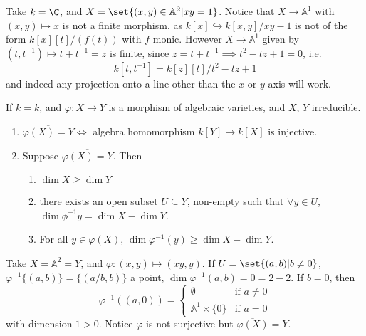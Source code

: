 \documentclass{article}
\newcommand{\A}{\mathbb{A}}
\begin{document}
\begin{eg}
    Take $k = \C$, and $X = \set{(x, y) \in \A^2 | x y = 1}$. Notice that $X \to \A^1$ with $(x, y) \mapsto x$ is not a finite morphism, as $k[x] \hookrightarrow k[x, y] /xy-1$ is not of the form $k[x][t]/(f(t))$ with $f$ monic.
    However $X \to \A^1$ given by $(t, t^{-1}) \mapsto t + t^{-1} = z$ is finite, since $z = t+t^{-1} \implies t^2 - tz + 1 = 0$, i.e.\
    \begin{equation}
        k[t, t^{-1}] = k[z][t]/t^2-tz+1
    \end{equation}
    and indeed any projection onto a line other than the $x$ or $y$ axis will work.
\end{eg}
\begin{thm}
    If $k = \overline{k}$, and $\varphi: X \to Y$ is a morphism of algebraic varieties, and $X$, $Y$ irreducible.
    \begin{enumerate}[label=(\alph*)]
        \item $\overline{\varphi(X) = Y} \iff$ algebra homomorphism $k[Y] \to k[X]$ is injective.
        \item Suppose $\overline{\varphi(X) = Y}$. Then
            \begin{enumerate}[label=(\roman*)]
                \item $\dim X \geq \dim Y$
                \item there exists an open subset $U \subseteq Y$, non-empty such that $\forall y \in U$, $\dim \phi^{-1} y = \dim X - \dim Y$.
                \item For all $y \in \varphi(X)$, $\dim \varphi^{-1}(y) \geq \dim X - \dim Y$.
            \end{enumerate}
    \end{enumerate}
\end{thm}
\begin{eg}
    Take $X = \A^2 = Y$, and $\varphi: (x, y) \mapsto (xy, y)$.
    If $U = \set{(a, b) | b \neq 0}$, $\varphi^{-1}\{(a, b)\} = \{(a/b, b)\}$ a point, $\dim \varphi^{-1}(a, b) = 0 = 2- 2$.
    If $b = 0$, then
    \begin{equation}
        \varphi^{-1}((a, 0)) =
        \begin{cases}
            \emptyset & \text{if } a \neq 0 \\
            \A^1 \times \{0\} & \text{if } a = 0
        \end{cases}
    \end{equation}
    with dimension $1 > 0$. Notice $\varphi$ is not surjective but $\overline{\varphi(X)} = Y$.
\end{eg}
\end{document}
